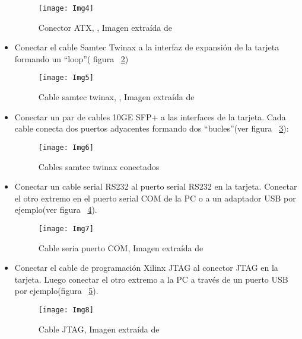 \begin{itemize}
\begin{figure}[htbp!] 
\centering    
\texttt{[image: Img4]}
\caption[Conector ATX]{Conector ATX, , Imagen extra\'ida de \citep{NetFPGA6}}
\label{fig:Img4}
\end{figure}

\item Conectar el cable Samtec Twinax a la interfaz de expansión de la tarjeta formando un “loop”( figura ~\ref{fig:Img5})

\newpage
\begin{figure}[htbp!] 
\centering    
\texttt{[image: Img5]}
\caption[Cable samtec twinax]{Cable samtec twinax, , Imagen extra\'ida de \citep{NetFPGA6}}
\label{fig:Img5}
\end{figure}

\item Conectar un par de cables 10GE SFP+ a las interfaces de la tarjeta. Cada cable conecta dos puertos adyacentes formando dos “bucles”(ver figura ~\ref{fig:Img6}):

\begin{figure}[htbp!] 
\centering    
\texttt{[image: Img6]}
\caption[Cables samtec twinax conectados]{Cables samtec twinax conectados}
\label{fig:Img6}
\end{figure}

\item Conectar un cable serial RS232 al puerto serial RS232 en la tarjeta. Conectar el otro extremo en el puerto serial COM de la PC o a un adaptador USB por ejemplo(ver figura ~\ref{fig:Img7}).

\begin{figure}[htbp!] 
\centering    
\texttt{[image: Img7]}
\caption[Cable serial puerto COM]{Cable seria puerto COM, Imagen extra\'ida de \citep{NetFPGA6}}
\label{fig:Img7}
\end{figure}

\item Conectar el cable de programación Xilinx JTAG al conector JTAG en la tarjeta. Luego conectar el otro extremo a la PC a través de un puerto USB por ejemplo(figura ~\ref{fig:Img8}).

\newpage
\begin{figure}[htbp!] 
\centering    
\texttt{[image: Img8]}
\caption[Cable JTAG]{Cable JTAG, Imagen extra\'ida de \citep{NetFPGA6}}
\label{fig:Img8}
\end{figure}

\end{itemize}

